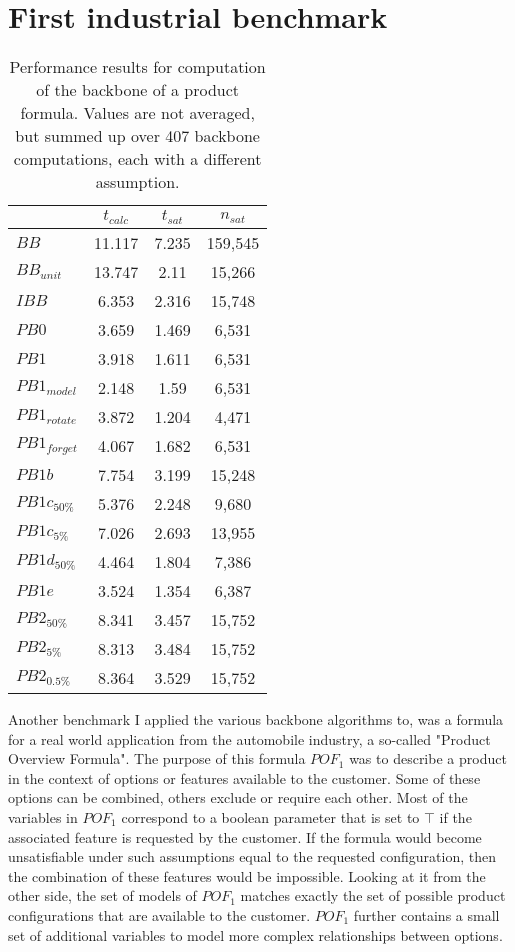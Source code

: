 \section{First industrial benchmark}
\label{sec:sectionVonThore}

\begin{wraptable}[29]{r}{7cm}
\begin{tabular}{l| c c c }
&$t_{calc}$ & $t_{sat}$& $n_{sat}$ \\
\hline
$BB$ & 11.117 & 7.235 & 159,545 \\
$BB_{unit}$ & 13.747 & 2.11 & 15,266 \\
$IBB$ & 6.353 & 2.316 & 15,748 \\
$PB0$ & 3.659 & 1.469 & 6,531 \\
$PB1$ & 3.918 & 1.611 & 6,531 \\
$PB1_{model}$ & 2.148 & 1.59 & 6,531 \\
$PB1_{rotate}$ & 3.872 & 1.204 & 4,471 \\
$PB1_{forget}$ & 4.067 & 1.682 & 6,531 \\
$PB1b$ & 7.754 & 3.199 & 15,248 \\ %
$PB1c_{50\%}$ & 5.376 & 2.248 & 9,680 \\
$PB1c_{5\%}$ & 7.026 & 2.693 & 13,955 \\
$PB1d_{50\%}$ & 4.464 & 1.804 & 7,386 \\
$PB1e$ & 3.524 & 1.354 & 6,387 \\
$PB2_{50\%}$ & 8.341 & 3.457 & 15,752 \\
$PB2_{5\%}$ & 8.313 & 3.484 & 15,752 \\
$PB2_{0.5\%}$ & 8.364 & 3.529 & 15,752 \\
\end{tabular}
\caption[Performance results of first industrial benchmark]{Performance results for computation of the backbone of a product formula. Values are not averaged, but summed up over 407 backbone computations, each with a different assumption.}
\label{tab:vonThore1}
\end{wraptable}

Another benchmark I applied the various backbone algorithms to, was a formula for a real world application from the automobile industry, a so-called "Product Overview Formula". The purpose of this formula $POF_1$ was to describe a product in the context of options or features available to the customer. Some of these options can be combined, others exclude or require each other. Most of the variables in $POF_1$ correspond to a boolean parameter that is set to $\top$ if the associated feature is requested by the customer. If the formula would become unsatisfiable under such assumptions equal to the requested configuration, then the combination of these features would be impossible. Looking at it from the other side, the set of models of $POF_1$ matches exactly the set of possible product configurations that are available to the customer. $POF_1$ further contains a small set of additional variables to model more complex relationships between options.

